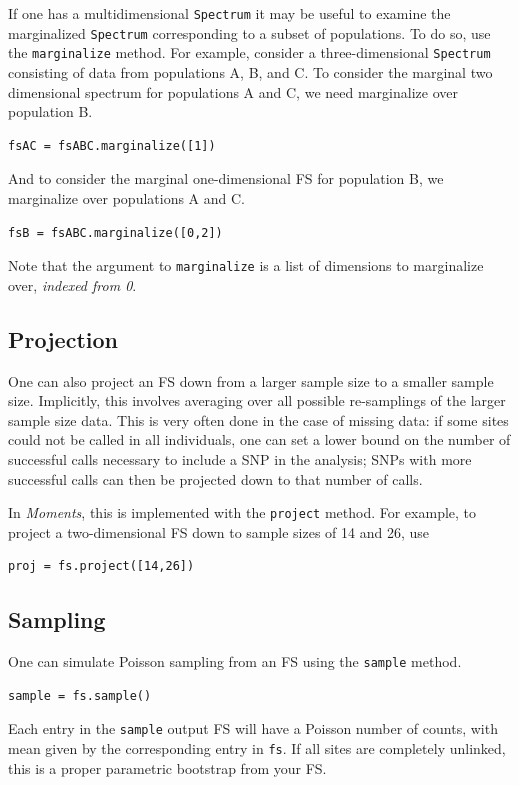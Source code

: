 \documentclass[12pt]{article}
\makeatletter
\newcommand{\py}[1]{\lstinline[breaklines=true,language=Python, showstringspaces=False]@#1@}
\makeatother
\begin{document}
If one has a multidimensional \py{Spectrum} it may be useful to examine the marginalized \py{Spectrum} corresponding to a subset of populations.
To do so, use the \py{marginalize} method.
For example, consider a three-dimensional \py{Spectrum} consisting of data from populations A, B, and C.
To consider the marginal two dimensional spectrum for populations A and C, we need marginalize over population B.
\begin{lstlisting}
fsAC = fsABC.marginalize([1])
\end{lstlisting}
And to consider the marginal one-dimensional FS for population B, we marginalize over populations A and C.
\begin{lstlisting}
fsB = fsABC.marginalize([0,2])
\end{lstlisting}
Note that the argument to \py{marginalize} is a list of dimensions to marginalize over, \emph{indexed from 0}.

\subsection{Projection}

One can also project an FS down from a larger sample size to a smaller sample size.
Implicitly, this involves averaging over all possible re-samplings of the larger sample size data.
This is very often done in the case of missing data: if some sites could not be called in all individuals, one can set a lower bound on the number of successful calls necessary to include a SNP in the analysis; SNPs with more successful calls can then be projected down to that number of calls.

In \textit{Moments}, this is implemented with the \py{project} method.
For example, to project a two-dimensional FS down to sample sizes of 14 and 26, use
\begin{lstlisting}
proj = fs.project([14,26])
\end{lstlisting}

\subsection{Sampling}

One can simulate Poisson sampling from an FS using the \py{sample} method.
\begin{lstlisting}
sample = fs.sample()
\end{lstlisting}
Each entry in the \py{sample} output FS will have a Poisson number of counts, with mean given by the corresponding entry in \py{fs}.
If all sites are completely unlinked, this is a proper parametric bootstrap from your FS.
\end{document}

